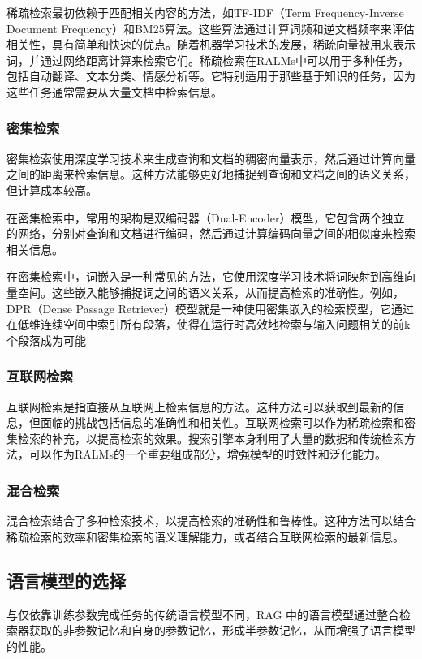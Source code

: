 稀疏检索最初依赖于匹配相关内容的方法，如TF-IDF（Term Frequency-Inverse Document Frequency）和BM25算法。这些算法通过计算词频和逆文档频率来评估相关性，具有简单和快速的优点。随着机器学习技术的发展，稀疏向量被用来表示词，并通过网络距离计算来检索它们。稀疏检索在RALMs中可以用于多种任务，包括自动翻译、文本分类、情感分析等。它特别适用于那些基于知识的任务，因为这些任务通常需要从大量文档中检索信息。

\subsubsection{密集检索}
密集检索使用深度学习技术来生成查询和文档的稠密向量表示，然后通过计算向量之间的距离来检索信息。这种方法能够更好地捕捉到查询和文档之间的语义关系，但计算成本较高。

在密集检索中，常用的架构是双编码器（Dual-Encoder）模型，它包含两个独立的网络，分别对查询和文档进行编码，然后通过计算编码向量之间的相似度来检索相关信息。

在密集检索中，词嵌入是一种常见的方法，它使用深度学习技术将词映射到高维向量空间。这些嵌入能够捕捉词之间的语义关系，从而提高检索的准确性。例如，DPR（Dense Passage Retriever）模型就是一种使用密集嵌入的检索模型，它通过在低维连续空间中索引所有段落，使得在运行时高效地检索与输入问题相关的前k个段落成为可能

\subsubsection{互联网检索}
互联网检索是指直接从互联网上检索信息的方法。这种方法可以获取到最新的信息，但面临的挑战包括信息的准确性和相关性。互联网检索可以作为稀疏检索和密集检索的补充，以提高检索的效果。搜索引擎本身利用了大量的数据和传统检索方法，可以作为RALMs的一个重要组成部分，增强模型的时效性和泛化能力。\cite{komeili2021internetaugmenteddialoguegeneration}
\subsubsection{混合检索}
混合检索结合了多种检索技术，以提高检索的准确性和鲁棒性。这种方法可以结合稀疏检索的效率和密集检索的语义理解能力，或者结合互联网检索的最新信息。\cite{lazaridou2022internetaugmentedlanguagemodelsfewshot}
\subsection{语言模型的选择}
与仅依靠训练参数完成任务的传统语言模型不同，RAG 中的语言模型通过整合检索器获取的非参数记忆和自身的参数记忆，形成半参数记忆，从而增强了语言模型的性能。
